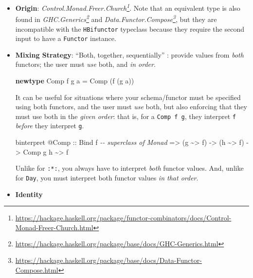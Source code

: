 \documentclass[]{article}
\newenvironment{Shaded}{}{}
\newcommand{\CommentTok}[1]{\textcolor[rgb]{0.38,0.63,0.69}{\textit{#1}}}
\newcommand{\DataTypeTok}[1]{\textcolor[rgb]{0.56,0.13,0.00}{#1}}
\newcommand{\KeywordTok}[1]{\textcolor[rgb]{0.00,0.44,0.13}{\textbf{#1}}}
\newcommand{\NormalTok}[1]{#1}
\newcommand{\OperatorTok}[1]{\textcolor[rgb]{0.40,0.40,0.40}{#1}}
\newcommand{\OtherTok}[1]{\textcolor[rgb]{0.00,0.44,0.13}{#1}}
\renewcommand{\href}[2]{#2\footnote{\url{#1}}}
\begin{document}
\begin{itemize}
\item
  \textbf{Origin}:
  \emph{\href{https://hackage.haskell.org/package/functor-combinators/docs/Control-Monad-Freer-Church.html}{Control.Monad.Freer.Church}}.
  Note that an equivalent type is also found in
  \emph{\href{https://hackage.haskell.org/package/base/docs/GHC-Generics.html}{GHC.Generics}}
  and
  \emph{\href{https://hackage.haskell.org/package/base/docs/Data-Functor-Compose.html}{Data.Functor.Compose}},
  but they are incompatible with the \texttt{HBifunctor} typeclass because they
  require the second input to have a \texttt{Functor} instance.
\item
  \textbf{Mixing Strategy}: ``Both, together, sequentially'' : provide values
  from \emph{both} functors; the user must \emph{use} both, and \emph{in order}.

\begin{Shaded}
\begin{Highlighting}[]
\KeywordTok{newtype} \DataTypeTok{Comp}\NormalTok{ f g a }\OtherTok{=} \DataTypeTok{Comp}\NormalTok{ (f (g a))}
\end{Highlighting}
\end{Shaded}

  It can be useful for situations where your schema/functor must be specified
  using both functors, and the user must \emph{use} both, but also enforcing
  that they must use both in the \emph{given order}: that is, for a
  \texttt{Comp\ f\ g}, they interpret \texttt{f} \emph{before} they interpret
  \texttt{g}.

\begin{Shaded}
\begin{Highlighting}[]
\NormalTok{binterpret }\OperatorTok{@}\DataTypeTok{Comp}
\OtherTok{    ::} \DataTypeTok{Bind}\NormalTok{ f          }\CommentTok{{-}{-} superclass of Monad}
    \OtherTok{=\textgreater{}}\NormalTok{ (g }\OperatorTok{\textasciitilde{}\textgreater{}}\NormalTok{ f)}
    \OtherTok{{-}\textgreater{}}\NormalTok{ (h }\OperatorTok{\textasciitilde{}\textgreater{}}\NormalTok{ f)}
    \OtherTok{{-}\textgreater{}} \DataTypeTok{Comp}\NormalTok{ g h }\OperatorTok{\textasciitilde{}\textgreater{}}\NormalTok{ f}
\end{Highlighting}
\end{Shaded}

  Unlike for \texttt{:*:}, you always have to interpret \emph{both} functor
  values. And, unlike for \texttt{Day}, you must interpret both functor values
  \emph{in that order}.
\item
  \textbf{Identity}


\end{itemize}
\end{document}
